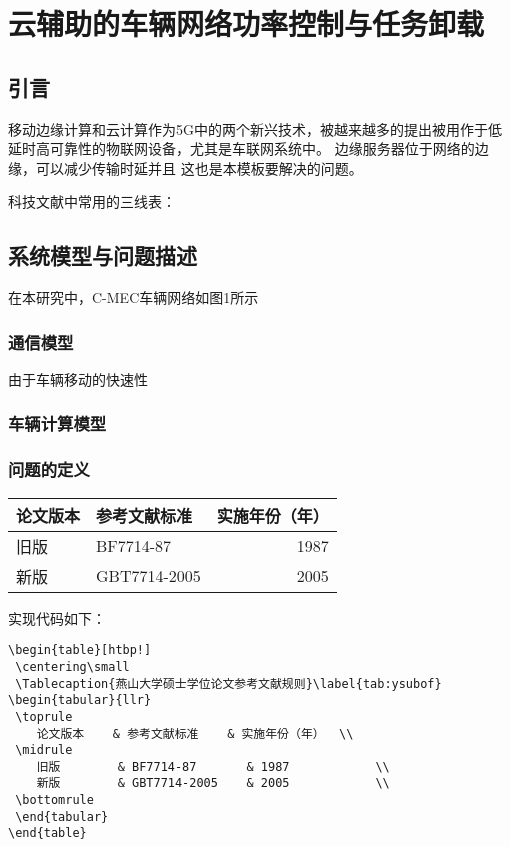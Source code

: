 \chapter{云辅助的车辆网络功率控制与任务卸载}
\label{chap:table}

\section{引言}\label{section3-1}
\label{chap:introduction}
移动边缘计算和云计算作为5G中的两个新兴技术，被越来越多的提出被用作于低延时高可靠性的物联网设备，尤其是车联网系统中。
边缘服务器位于网络的边缘，可以减少传输时延并且
这也是本模板要解决的问题。

科技文献中常用的三线表：
\section{系统模型与问题描述}\label{section3-2}
在本研究中，C-MEC车辆网络如图1所示

\subsection{通信模型}\label{section3-2-1}
由于车辆移动的快速性

\subsection{车辆计算模型}\label{section3-2-2}

\subsection{问题的定义}\label{section3-2-3}
\begin{table}[htbp!]
 \centering\small
 \label{tab:ysubof}
\begin{tabular}{llr}
 \toprule
    论文版本    & 参考文献标准    & 实施年份（年）  \\
 \midrule
    旧版        & BF7714-87       & 1987            \\
    新版        & GBT7714-2005    & 2005            \\
 \bottomrule
 \end{tabular}
\end{table}

实现代码如下：
\begin{verbatim}
\begin{table}[htbp!]
 \centering\small
 \Tablecaption{燕山大学硕士学位论文参考文献规则}\label{tab:ysubof}
\begin{tabular}{llr}
 \toprule
    论文版本    & 参考文献标准    & 实施年份（年）  \\
 \midrule
    旧版        & BF7714-87       & 1987            \\
    新版        & GBT7714-2005    & 2005            \\
 \bottomrule
 \end{tabular}
\end{table}
\end{verbatim}

